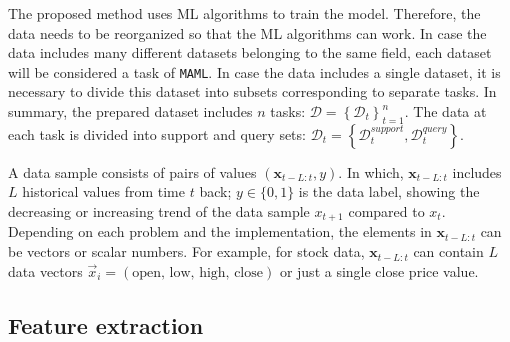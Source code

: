 \documentclass[aps,prb,groupedaddress,twocolumn,showpacs,dvipdfmx,superscriptaddress,pdftex]{revtex4-2}
\begin{document}
The proposed method uses ML algorithms to train the model. Therefore, the data needs to be reorganized so that the ML algorithms can work. In case the data includes many different datasets belonging to the same field, each dataset will be considered a task of \verb|MAML|. In case the data includes a single dataset, it is necessary to divide this dataset into subsets corresponding to separate tasks. In summary, the prepared dataset includes $n$ tasks: $\mathcal{D} = \left\{ \mathcal{D}_t \right\}_{t=1}^{n}$. The data at each task is divided into support and query sets: $\mathcal{D}_t = \left\{ \mathcal{D}_t^{support}, \mathcal{D}_t^{query} \right\}$.

\vspace{2mm}


A data sample consists of pairs of values $(\mathbf{x}_{t-L:t}, y)$. In which, $\mathbf{x}_{t-L:t}$ includes $L$ historical values from time $t$ back; $y\in \{0,1\}$ is the data label, showing the decreasing or increasing trend of the data sample $x_{t+1}$ compared to $x_{t}$. Depending on each problem and the implementation, the elements in $\mathbf{x}_{t-L:t}$ can be vectors or scalar numbers. For example, for stock data, $\mathbf{x}_{t-L:t}$ can contain $L$ data vectors $\vec x_i = (\text{open, low, high, close})$ or just a single close price value.



\subsection{Feature extraction}
\end{document}
